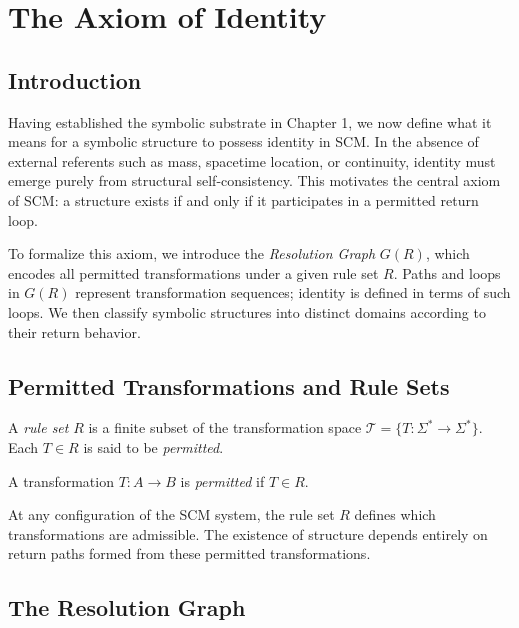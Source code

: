 \chapter{The Axiom of Identity}

\section*{Introduction}

Having established the symbolic substrate in Chapter 1, we now define what it means for a symbolic structure to possess identity in SCM. In the absence of external referents such as mass, spacetime location, or continuity, identity must emerge purely from structural self-consistency. This motivates the central axiom of SCM: a structure exists if and only if it participates in a permitted return loop.

To formalize this axiom, we introduce the \emph{Resolution Graph} $G(R)$, which encodes all permitted transformations under a given rule set $R$. Paths and loops in $G(R)$ represent transformation sequences; identity is defined in terms of such loops. We then classify symbolic structures into distinct domains according to their return behavior.

\section{Permitted Transformations and Rule Sets}

\begin{definition}
A \emph{rule set} $R$ is a finite subset of the transformation space $\mathcal{T} = \{T : \Sigma^* \to \Sigma^*\}$. Each $T \in R$ is said to be \emph{permitted}.
\end{definition}

\begin{definition}
A transformation $T: A \to B$ is \emph{permitted} if $T \in R$.
\end{definition}

\noindent
At any configuration of the SCM system, the rule set $R$ defines which transformations are admissible. The existence of structure depends entirely on return paths formed from these permitted transformations.

\section{The Resolution Graph}

